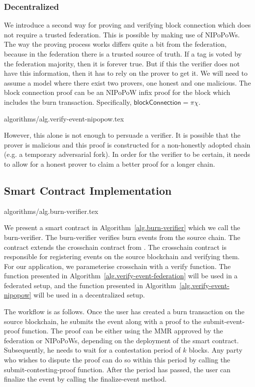 \subsubsection{Decentralized}
We introduce a second way for proving and verifying block connection which does not require a trusted federation. This is possible by making use of NIPoPoWs. The way the proving process works differs quite a bit from the federation, because in the federation there is a trusted source of truth. If a tag is voted by the federation majority, then it is forever true. But if this the verifier does not have this information, then it has to rely on the prover to get it. We will need to assume a model where there exist two provers, one honest and one malicious. The block connection proof can be an NIPoPoW infix proof for the block which includes the burn transaction. Specifically, $\mathsf{blockConnection} = \pi\chi$.

{algorithms/alg.verify-event-nipopow.tex}

However, this alone is not enough to persuade a verifier. It is possible that the prover is malicious and this proof is constructed for a non-honestly adopted chain (e.g. a temporary adversarial fork). In order for the verifier to be certain, it needs to allow for a honest prover to claim a better proof for a longer chain.

\subsection{Smart Contract Implementation}
{algorithms/alg.burn-verifier.tex}

We present a smart contract in Algorithm~\ref{alg.burn-verifier} which we call the \textsf{burn-verifier}. The \textsf{burn-verifier} verifies burn events from the source chain. The contract extends the \textsf{crosschain} contract from \cite{pow-sidechains}. The \textsf{crosschain} contract is responsible for registering events on the source blockchain and verifying them. For our application, we parameterise \textsf{crosschain} with a \textsf{verify} function. The function presented in Algorithm~\ref{alg.verify-event-federation} will be used in a federated setup, and the function presented in Algorithm~\ref{alg.verify-event-nipopow} will be used in a decentralized setup.

The workflow is as follows. Once the user has created a burn transaction on the source blockchain, he submits the event along with a proof to the \textsf{submit-event-proof} function. The proof can be either using the MMR approved by the federation or NIPoPoWs, depending on the deployment of the smart contract. Subsequently, he needs to wait for a contestation period of $k$ blocks. Any party who wishes to dispute the proof can do so within this period by calling the \textsf{submit-contesting-proof} function. After the period has passed, the user can finalize the event by calling the \textsf{finalize-event} method.

